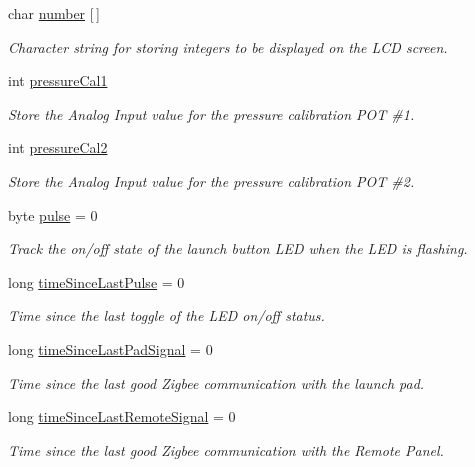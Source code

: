 \begin{DoxyCompactItemize}
char \hyperlink{masterPanel_8ino_a0ea7c2d76ab718bd82cf6259b26ed3ed}{number} \mbox{[}$\,$\mbox{]}
\begin{DoxyCompactList}\small\item\em Character string for storing integers to be displayed on the L\+CD screen. \end{DoxyCompactList}\item 
int \hyperlink{masterPanel_8ino_a3e1010b728ac3d5d91ffc657006d630f}{pressure\+Cal1}
\begin{DoxyCompactList}\small\item\em Store the Analog Input value for the pressure calibration P\+OT \#1. \end{DoxyCompactList}\item 
int \hyperlink{masterPanel_8ino_a686c48254491c41288fdf685b232594d}{pressure\+Cal2}
\begin{DoxyCompactList}\small\item\em Store the Analog Input value for the pressure calibration P\+OT \#2. \end{DoxyCompactList}\item 
byte \hyperlink{masterPanel_8ino_a3122ae67163a917df3ce95816c7c44e7}{pulse} = 0
\begin{DoxyCompactList}\small\item\em Track the on/off state of the launch button L\+ED when the L\+ED is flashing. \end{DoxyCompactList}\item 
long \hyperlink{masterPanel_8ino_af8d9d76d18b6aee4b209d4f3b9f2d8d3}{time\+Since\+Last\+Pulse} = 0
\begin{DoxyCompactList}\small\item\em Time since the last toggle of the L\+ED on/off status. \end{DoxyCompactList}\item 
long \hyperlink{masterPanel_8ino_af44f6a2e4c00006fb058d00348168159}{time\+Since\+Last\+Pad\+Signal} = 0
\begin{DoxyCompactList}\small\item\em Time since the last good Zigbee communication with the launch pad. \end{DoxyCompactList}\item 
long \hyperlink{masterPanel_8ino_a3840f059f2cf5d2544a8eb65120ecc31}{time\+Since\+Last\+Remote\+Signal} = 0
\begin{DoxyCompactList}\small\item\em Time since the last good Zigbee communication with the Remote Panel. \end{DoxyCompactList}\item 

\end{DoxyCompactItemize}
